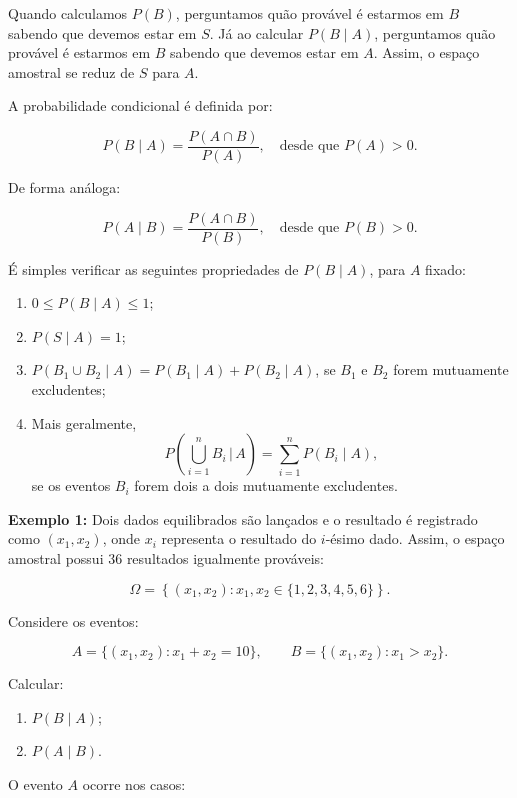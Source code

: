 Quando calculamos $P(B)$, perguntamos quão provável é estarmos em $B$ sabendo que devemos estar em $S$.
Já ao calcular $P(B\mid A)$, perguntamos quão provável é estarmos em $B$ sabendo que devemos estar em $A$.
Assim, o espaço amostral se reduz de $S$ para $A$.\vskip0.3cm

A probabilidade condicional é definida por:

\begin{equation}
    P(B\mid A)=\frac{P(A\cap B)}{P(A)}, \quad \text{desde que } P(A)>0.
\end{equation}

De forma análoga:

\begin{equation}
    P(A\mid B)=\frac{P(A\cap B)}{P(B)}, \quad \text{desde que } P(B)>0.
\end{equation}

É simples verificar as seguintes propriedades de $P(B\mid A)$, para $A$ fixado:

\begin{enumerate}
    \item $0\leq P(B\mid A)\leq 1$;
    \item $P(S\mid A)=1$;
    \item $P(B_{1}\cup B_{2}\mid A)=P(B_{1}\mid A)+P(B_{2}\mid A)$,
    se $B_{1}$ e $B_{2}$ forem mutuamente excludentes;
    \item Mais geralmente,
    \[
    P\left(\bigcup_{i=1}^{n}B_i \,\Big|\, A\right)=\sum_{i=1}^{n}P(B_i\mid A),
    \]
    se os eventos $B_i$ forem dois a dois mutuamente excludentes.
\end{enumerate}


\textbf{Exemplo 1:} Dois dados equilibrados são lançados e o resultado é registrado como $(x_{1},x_{2})$,
onde $x_i$ representa o resultado do $i$-ésimo dado. Assim, o espaço amostral possui $36$ resultados igualmente prováveis:

\[
\Omega=
\left\{
(x_1,x_2):x_1,x_2\in\{1,2,3,4,5,6\}
\right\}.
\]

Considere os eventos:

\[
A=\{(x_1,x_2):x_1+x_2=10\},
\qquad
B=\{(x_1,x_2):x_1>x_2\}.
\]

Calcular:

\begin{enumerate}
    \item $P(B\mid A)$;
    \item $P(A\mid B)$.
\end{enumerate}

O evento $A$ ocorre nos casos:

